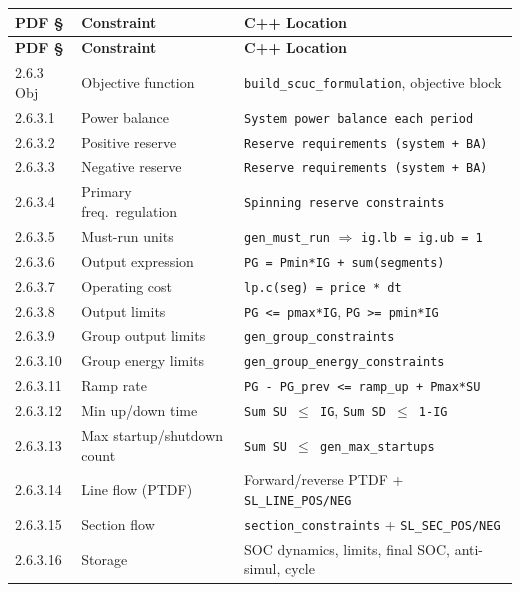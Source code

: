 \begin{longtable}{lll}
\toprule
\textbf{PDF §} & \textbf{Constraint} & \textbf{C++ Location} \\
\midrule
\endfirsthead
\toprule
\textbf{PDF §} & \textbf{Constraint} & \textbf{C++ Location} \\
\midrule
\endhead
2.6.3 Obj    & Objective function           & \texttt{build\_scuc\_formulation}, objective block \\
2.6.3.1      & Power balance                & \texttt{System power balance each period} \\
2.6.3.2      & Positive reserve             & \texttt{Reserve requirements (system + BA)} \\
2.6.3.3      & Negative reserve             & \texttt{Reserve requirements (system + BA)} \\
2.6.3.4      & Primary freq.\ regulation    & \texttt{Spinning reserve constraints} \\
2.6.3.5      & Must-run units               & \texttt{gen\_must\_run} $\Rightarrow$ \texttt{ig.lb = ig.ub = 1} \\
2.6.3.6      & Output expression            & \texttt{PG = Pmin*IG + sum(segments)} \\
2.6.3.7      & Operating cost               & \texttt{lp.c(seg) = price * dt} \\
2.6.3.8      & Output limits                & \texttt{PG <= pmax*IG}, \texttt{PG >= pmin*IG} \\
2.6.3.9      & Group output limits          & \texttt{gen\_group\_constraints} \\
2.6.3.10     & Group energy limits          & \texttt{gen\_group\_energy\_constraints} \\
2.6.3.11     & Ramp rate                    & \texttt{PG - PG\_prev <= ramp\_up + Pmax*SU} \\
2.6.3.12     & Min up/down time             & \texttt{Sum SU $\leq$ IG}, \texttt{Sum SD $\leq$ 1-IG} \\
2.6.3.13     & Max startup/shutdown count   & \texttt{Sum SU $\leq$ gen\_max\_startups} \\
2.6.3.14     & Line flow (PTDF)             & Forward/reverse PTDF + \texttt{SL\_LINE\_POS/NEG} \\
2.6.3.15     & Section flow                 & \texttt{section\_constraints} + \texttt{SL\_SEC\_POS/NEG} \\
2.6.3.16     & Storage                      & SOC dynamics, limits, final SOC, anti-simul, cycle \\

\end{longtable}
